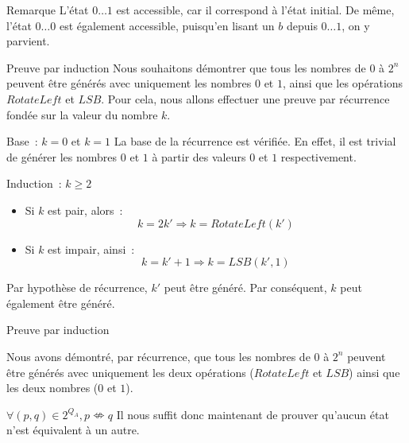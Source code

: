 \begin{frame}{\myframetitle}
  \begin{block}{Remarque}
    L'état \(0 \ldots 1 \) est accessible, car il correspond à l'état initial.
    De même, l'état \(0 \ldots 0\) est également accessible, puisqu'en lisant un
    \(b\) depuis \(0 \ldots 1\), on y parvient.
  \end{block}

  \pause[]

  \begin{block}{Preuve par induction}
    Nous souhaitons démontrer que tous les nombres de \(0\) à \(2^n\) peuvent
    être générés avec uniquement les nombres \(0\) et \(1\), ainsi que les
    opérations \(RotateLeft\) et \(LSB\). Pour cela, nous allons effectuer une
    preuve par récurrence fondée sur la valeur du nombre \(k\).
  \end{block}
\end{frame}

\begin{frame}{\myframetitle}
  \begin{block}{Base~: \(k = 0\) et \(k = 1\)}
    La base de la récurrence est vérifiée. En effet, il est trivial de générer
    les nombres \(0\) et \(1\) à partir des valeurs \(0\) et \(1\)
    respectivement.
  \end{block}
\end{frame}

\begin{frame}{\myframetitle}
  \begin{block}{Induction~: \(k \geq 2\)}
    \begin{itemize}
      \item Si \(k\) est pair, alors~:
        \[
          k = 2 k' \Longrightarrow k = RotateLeft(k')
        \]
      \item Si \(k\) est impair, ainsi~:
        \[
          k = k' + 1 \Longrightarrow k = LSB(k', 1)
        \]
    \end{itemize}
    Par hypothèse de récurrence, \(k'\) peut être généré. Par conséquent, \(k\)
    peut également être généré.
  \end{block}
\end{frame}

\begin{frame}{\myframetitle}
  \begin{block}{Preuve par induction}

    Nous avons démontré, par récurrence, que tous les nombres de \(0\) à \(2^n\)
    peuvent être générés avec uniquement les deux opérations (\(RotateLeft\) et
    \(LSB\)) ainsi que les deux nombres (\(0\) et \(1\)).
  \end{block}

  \pause[]

  \begin{block}{\(\forall (p, q) \in 2^{Q_A}, p \nLeftrightarrow q\)}
    Il nous suffit donc maintenant de prouver qu'aucun état n'est équivalent à
    un autre.
  \end{block}
\end{frame}

